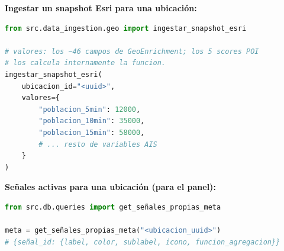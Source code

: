 \documentclass[12pt, a4paper]{article}
\begin{document}
\textbf{Ingestar un snapshot Esri para una ubicación:}
\begin{lstlisting}[language=Python]
from src.data_ingestion.geo import ingestar_snapshot_esri

# valores: los ~46 campos de GeoEnrichment; los 5 scores POI
# los calcula internamente la funcion.
ingestar_snapshot_esri(
    ubicacion_id="<uuid>",
    valores={
        "poblacion_5min": 12000,
        "poblacion_10min": 35000,
        "poblacion_15min": 58000,
        # ... resto de variables AIS
    }
)
\end{lstlisting}

\textbf{Señales activas para una ubicación (para el panel):}
\begin{lstlisting}[language=Python]
from src.db.queries import get_señales_propias_meta

meta = get_señales_propias_meta("<ubicacion_uuid>")
# {señal_id: {label, color, sublabel, icono, funcion_agregacion}}
\end{lstlisting}

\end{document}
